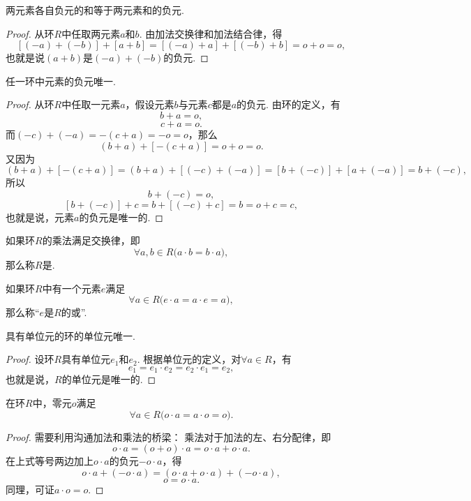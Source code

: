 \begin{property}
两元素各自负元的和等于两元素和的负元.
\begin{proof}
从环\(R\)中任取两元素\(a\)和\(b\).
由加法交换律和加法结合律，得\[
    [(-a) + (-b)] + [a + b]
    = [(-a) + a] + [(-b) + b]
    = o + o = o,
\]
也就是说\((a+b)\)是\((-a) + (-b)\)的负元.
\end{proof}
\end{property}

\begin{property}
任一环中元素的负元唯一.
\begin{proof}
从环\(R\)中任取一元素\(a\)，假设元素\(b\)与元素\(c\)都是\(a\)的负元.
由环的定义，有\[
    b + a = o,
\]\[
    c + a = o.
\]
而\((-c) + (-a) = -(c + a) = -o = o\)，那么\[
    (b + a) + [-(c + a)]
    = o + o = o.
\]又因为\[
    (b + a) + [-(c + a)]
    = (b + a) + [(-c) + (-a)]
    = [b + (-c)] + [a + (-a)]
    = b + (-c),
\]所以\[
    b + (-c) = o,
\]\[
    [b + (-c)] + c = b + [(-c) + c] = b = o + c = c,
\]
也就是说，元素\(a\)的负元是唯一的.
\end{proof}
\end{property}

\begin{definition}
如果环\(R\)的乘法满足交换律，即\[
    \forall a,b \in R \bigl( a \cdot b = b \cdot a \bigr),
\]
那么称\(R\)是.
\end{definition}

\begin{definition}
如果环\(R\)中有一个元素\(e\)满足\[
    \forall a \in R \bigl( e \cdot a = a \cdot e = a \bigr),
\]
那么称“\(e\)是\(R\)的或”.
\end{definition}

\begin{property}
具有单位元的环的单位元唯一.
\begin{proof}
设环\(R\)具有单位元\(e_1\)和\(e_2\).
根据单位元的定义，对\(\forall a \in R\)，有\[
    e_1 = e_1 \cdot e_2 = e_2 \cdot e_1 = e_2,
\]
也就是说，\(R\)的单位元是唯一的.
\end{proof}
\end{property}

\begin{theorem}[乘零定理]
在环\(R\)中，零元\(o\)满足\[
    \forall a \in R \bigl( o \cdot a = a \cdot o = o \bigr).
\]
\begin{proof}
需要利用沟通加法和乘法的桥梁：
乘法对于加法的左、右分配律，即\[
    o \cdot a = (o + o) \cdot a = o \cdot a + o \cdot a.
\]在上式等号两边加上\(o \cdot a\)的负元\(-o \cdot a\)，得\[
    o \cdot a + (- o \cdot a) = (o \cdot a + o \cdot a) + (- o \cdot a),
\]\[
    o = o \cdot a.
\]
同理，可证\(a \cdot o = o\).
\end{proof}
\end{theorem}

